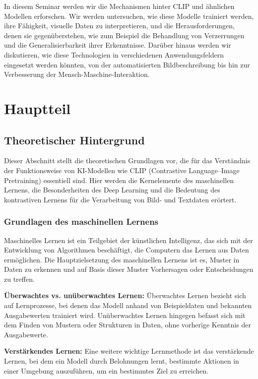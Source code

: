 \documentclass[nolibertine, ngerman, algorithm, nomencl, minted]{ttlab-qualify}
\begin{document}
In diesem Seminar werden wir die Mechanismen hinter CLIP und ähnlichen Modellen erforschen. Wir werden untersuchen, wie diese Modelle 
trainiert werden, ihre Fähigkeit, visuelle Daten zu interpretieren, und die Herausforderungen, denen sie gegenüberstehen, wie zum Beispiel 
die Behandlung von Verzerrungen und die Generalisierbarkeit ihrer Erkenntnisse. Darüber hinaus werden wir diskutieren, wie diese Technologien 
in verschiedenen Anwendungsfeldern eingesetzt werden könnten, von der automatisierten Bildbeschreibung bis hin zur Verbesserung 
der Mensch-Maschine-Interaktion.

\chapter{Hauptteil}
\section{Theoretischer Hintergrund}
Dieser Abschnitt stellt die theoretischen Grundlagen vor, die für das Verständnis der Funktionsweise von KI-Modellen wie CLIP (Contrastive Language–Image Pretraining) essentiell sind. Hier werden die Kernelemente des maschinellen Lernens, die Besonderheiten des Deep Learning und die Bedeutung des kontrastiven Lernens für die Verarbeitung von Bild- und Textdaten erörtert.

\subsection{Grundlagen des maschinellen Lernens}

Maschinelles Lernen ist ein Teilgebiet der künstlichen Intelligenz, das sich mit der Entwicklung von Algorithmen beschäftigt, die Computern das Lernen aus Daten ermöglichen. Die Hauptzielsetzung des maschinellen Lernens ist es, Muster in Daten zu erkennen und auf Basis dieser Muster Vorhersagen oder Entscheidungen zu treffen.

\textbf{Überwachtes vs. unüberwachtes Lernen:} Überwachtes Lernen bezieht sich auf Lernprozesse, bei denen das Modell anhand von Beispieldaten und bekannten Ausgabewerten trainiert wird. Unüberwachtes Lernen hingegen befasst sich mit dem Finden von Mustern oder Strukturen in Daten, ohne vorherige Kenntnis der Ausgabewerte.

\textbf{Verstärkendes Lernen:} Eine weitere wichtige Lernmethode ist das verstärkende Lernen, bei dem ein Modell durch Belohnungen lernt, bestimmte Aktionen in einer Umgebung auszuführen, um ein bestimmtes Ziel zu erreichen.
\end{document}
